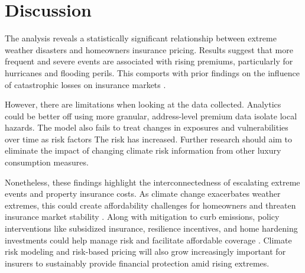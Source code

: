 \documentclass[12pt]{article}
\begin{document}
  


\section{Discussion}
\label{sec:disc}
The analysis reveals a statistically significant relationship between extreme weather disasters and homeowners insurance pricing. 
Results suggest that more frequent and severe events are associated with rising premiums, particularly for hurricanes and flooding 
perils. This comports with prior findings on the influence of catastrophic losses on insurance markets \citep{aon}.

However, there are limitations when looking at the data collected. Analytics could be better off using more granular, address-level 
premium data isolate local hazards. The model also fails to treat changes in exposures and vulnerabilities over time as risk factors
The risk has increased. Further research should aim to eliminate the impact of changing climate risk information from other luxury 
consumption measures.

Nonetheless, these findings highlight the interconnectedness of escalating extreme events and property insurance costs. As climate 
change exacerbates weather extremes, this could create affordability challenges for homeowners and threaten insurance market stability 
\citep{naic}. Along with mitigation to curb emissions, policy interventions like subsidized insurance, resilience incentives, and home 
hardening investments could help manage risk and facilitate affordable coverage \citep{kousky}. Climate risk modeling and risk-based 
pricing will also grow increasingly important for insurers to sustainably provide financial protection amid rising extremes.





\end{document}
